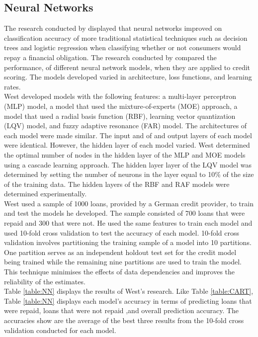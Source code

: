 \vspace{15pt}

\subsection{Neural Networks}

The research conducted by \textcite{DecTreesZekic} displayed that neural networks improved on classification accuracy of more traditional statistical techniques such as decision trees and logistic regression when classifying whether or not consumers would repay a financial obligation. The research conducted by \textcite{NNWest} compared the performance, of different neural network models, when they are applied to credit scoring.  The models developed varied in architecture, loss functions, and learning rates.  \\

West developed models with the following features: a multi-layer perceptron (MLP) model, a model that used the mixture-of-experts (MOE) approach, a model that used a radial basis function (RBF), learning vector quantization (LQV) model, and fuzzy adaptive resonance (FAR) model. The architectures of each model were made similar. The input and of and output layers of each model were identical. However, the hidden layer of each model varied. West determined the optimal number of nodes in the hidden layer of the MLP and MOE models using a cascade learning approach. The hidden layer layer of the LQV model was determined by setting the number of neurons in the layer equal to 10\% of the size of the training data. The hidden layers of the RBF and RAF models were determined experimentally.  \\

West used a sample of 1000 loans, provided by a German credit provider, to train and test the models he developed. The sample consisted of 700 loans that were repaid and 300 that were not. He used the same features to train each model and used 10-fold cross validation to test the accuracy of each model. 10-fold cross validation involves partitioning the training sample of a model into 10 partitions. One partition serves as an independent holdout test set for the credit model being trained while the remaining nine partitions are used to train the model. This technique minimises the effects of data dependencies and improves the reliability of the estimates. \\

Table \ref{table:NN} displays the results of West's research. Like Table \ref{table:CART}, Table \ref{table:NN} displays each model's accuracy in terms of predicting loans that were repaid, loans that were not repaid ,and overall prediction accuracy. The accuracies show are the average of the best three results from the 10-fold cross validation conducted for each model. 


